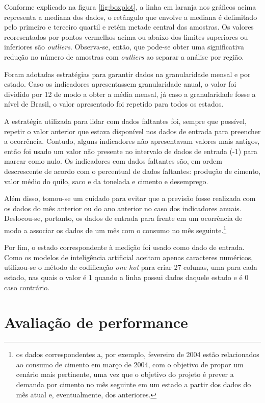 Conforme explicado na figura \ref{fig:boxplot}, a linha em 
laranja nos gráficos acima representa a mediana dos dados,
o retângulo que envolve a mediana é delimitado pelo primeiro e 
terceiro quartil e retém metade central das amostras. Os valores
reoresentados por pontos vermelhos acima ou abaixo dos limites
superiores ou inferiores são \textit{outliers}. Observa-se,
então, que pode-se obter uma significativa redução no número de 
amostras com \textit{outliers} ao separar a análise por região.\cite{boxplot}

Foram adotadas estratégias para garantir dados na granularidade
mensal e por estado. Caso os indicadores apresentassem granularidade anual, 
o valor foi dividido por 12 de modo a obter a média mensal, já caso a granularidade
fosse a nível de Brasil, o valor apresentado foi repetido para todos os 
estados.


A estratégia utilizada para lidar com dados faltantes foi, sempre que possível,
repetir o valor anterior que estava disponível nos dados de entrada para
preencher a ocorrência. Contudo, alguns indicadores não apresentavam 
valores mais antigos, então foi usado um valor não presente no intervalo
de dados de entrada (-1) para marcar como nulo. Os indicadores 
com dados faltantes são, em ordem descrescente de acordo com 
o percentual de dados faltantes: produção de cimento, valor 
médio do quilo, saco e da tonelada e cimento e desemprego.

Além disso, tomou-se um cuidado para evitar que a previsão fosse 
realizada com os dados do mês anterior ou do ano anterior no caso dos
indicadores anuais. Deslocou-se, portanto, os dados de entrada 
para frente em um ocorrência de modo a associar os dados de um 
mês com o consumo no mês seguinte.\footnote{os dados correspondentes 
a, por exemplo, fevereiro de 2004 estão relacionados ao consumo de 
cimento em março de 2004, com o objetivo de propor um cenário mais pertinente, 
uma vez que o objetivo do projeto é prever a demanda por cimento no mês seguinte 
em um estado a partir dos dados do mês atual e, eventualmente, dos anteriores.
}

Por fim, o estado correspondente à medição foi usado como dado de entrada. 
Como os modelos de inteligência artificial aceitam apenas caracteres numéricos,
utilizou-se o método de codificação \textit{one hot} para criar 27 colunas, uma
para cada estado, nas quais o valor é 1 quando a linha possui dados daquele estado 
e é 0 caso contrário.


    \section{Avaliação de performance}

